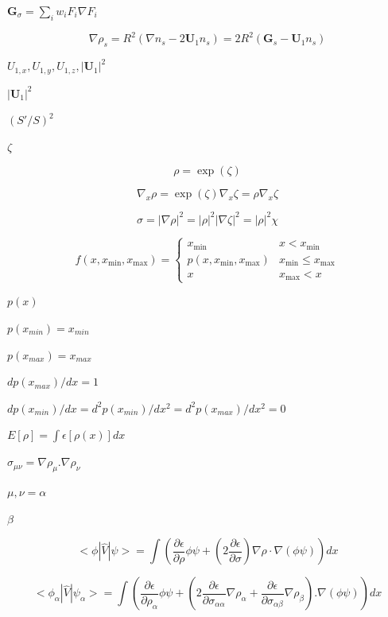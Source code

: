 \documentclass{article}
\begin{document}
$ \mathbf G_\sigma=\sum_i w_iF_i\nabla F_i $
\pagebreak

\[ \nabla\rho_s = R^2(\nabla n_s - 2\mathbf U_1 n_s) = 2R^2(\mathbf G_s - \mathbf U_1 n_s) \]
\pagebreak

$ U_{1,x}, U_{1,y}, U_{1,z}, |\mathbf U_1|^2 $
\pagebreak

$ |\mathbf U_1|^2 $
\pagebreak

$ (S'/S)^2 $
\pagebreak

$ \zeta $
\pagebreak

\[\rho = \exp(\zeta)
\]
\pagebreak

\[\nabla_x\rho = \exp(\zeta)\nabla_x\zeta = \rho \nabla_x\zeta
\]
\pagebreak

\[  \sigma = |\nabla\rho|^2 = |\rho|^2 |\nabla\zeta|^2 = |\rho|^2 \chi
\]
\pagebreak

\[f(x,x_{\mathrm{min}},x_{\mathrm{max}}) = \left\{
  \begin{array}{ll}
    x_{\mathrm{min}}                       & x < x_{\mathrm{min}} \\
    p(x,x_{\mathrm{min}},x_{\mathrm{max}}) & x_{\mathrm{min}} \leq x_{\mathrm{max}} \\
    x                                      & x_{\mathrm{max}} < x
  \end{array}
\right.
\]
\pagebreak

$p(x)$
\pagebreak

$p(x_{min})=x_{min}$
\pagebreak

$p(x_{max})=x_{max}$
\pagebreak

$dp(x_{max})/dx=1$
\pagebreak

$dp(x_{min})/dx=d^2p(x_{min})/dx^2=d^2p(x_{max})/dx^2=0$
\pagebreak

$ E[\rho] = \int \epsilon[\rho(x)] dx$
\pagebreak

$ \sigma_{\mu \nu} = \nabla \rho_{\mu} . \nabla \rho_{\nu} $
\pagebreak

$ \mu, \nu = \alpha$
\pagebreak

$ \beta $
\pagebreak

\[  < \phi | \hat V | \psi > = \int \left( \frac{\partial \epsilon}{\partial \rho} \phi \psi
                 +  \left( 2 \frac{\partial \epsilon}{\partial \sigma} \right)
                 \nabla \rho \cdot \nabla \left( \phi \psi \right) \right) dx
\]
\pagebreak

\[  < \phi_{\alpha} | \hat V | \psi_{\alpha} > = \int \left( \frac{\partial \epsilon}{\partial \rho_{\alpha}} \phi \psi
           +  \left( 2 \frac{\partial \epsilon}{\partial \sigma_{\alpha \alpha}} \nabla \rho_{\alpha}
           + \frac{\partial \epsilon}{\partial \sigma_{\alpha \beta}} \nabla \rho_{\beta}  \right) . \nabla \left( \phi \psi \right) \right) dx
\]
\pagebreak
\end{document}
